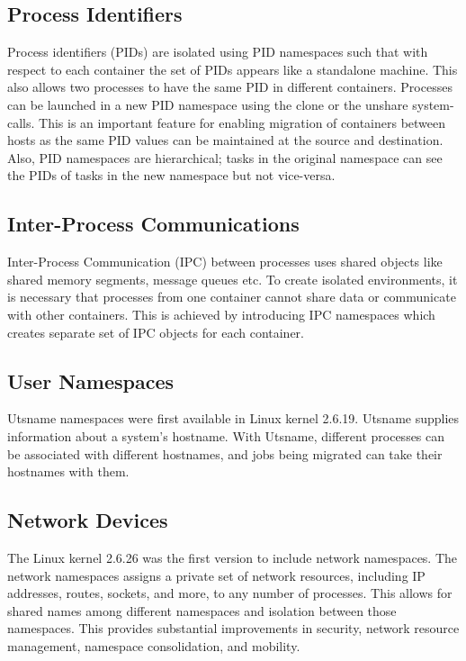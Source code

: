 \subsection{Process Identifiers}
Process identifiers (PIDs) are isolated using PID namespaces such that with respect to each container the set of PIDs appears like a standalone machine. This also allows two processes to  have the same PID in different containers. Processes can be launched in a new PID namespace using the clone or the unshare system-calls. This is an important feature for enabling migration of containers between hosts as the same PID values can be maintained at the source and destination. Also, PID namespaces are hierarchical; tasks in the original namespace can see the PIDs of tasks in the new namespace but not vice-versa.  

\subsection{Inter-Process Communications}
Inter-Process Communication (IPC) between processes uses shared objects like shared memory segments, message queues etc. To create isolated environments, it is necessary that processes from one container cannot share data or communicate with other containers. This is achieved by introducing IPC namespaces which creates separate set of IPC objects for each container.

\subsection{User Namespaces}
Utsname namespaces were first available in Linux kernel 2.6.19.  Utsname supplies information about a system's hostname.  With Utsname, different processes can be associated with different hostnames, and jobs being migrated can take their hostnames with them.

\subsection{Network Devices}
The Linux kernel 2.6.26 was the first version to include network namespaces.  The network namespaces assigns a private set of network resources, including IP addresses, routes, sockets, and more, to any number of processes.  This allows for shared names among different namespaces and isolation between those namespaces.  This provides substantial improvements in security, network resource management, namespace consolidation, and mobility.

